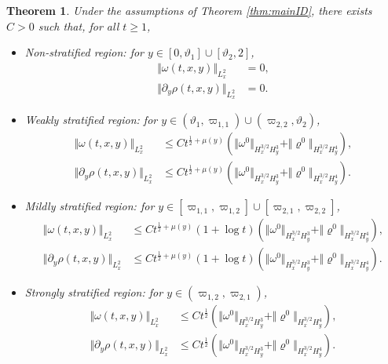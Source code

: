 \documentclass[11pt,reqno]{amsproc}
\newcounter{bigthm}
\newtheorem{bigtheorem}[bigthm]{Theorem}
\theoremstyle{definition}
\numberwithin{equation}{section}
\begin{document}
\begin{bigtheorem}\label{thm:growth}
Under the assumptions of Theorem \ref{thm:mainID}, there exists $C>0$ such that, for all $t\geq 1$, 
\begin{itemize}
\item {\em Non-stratified region:} for $y\in [0,\vartheta_1] \cup [\vartheta_2,2]$,
\begin{align}
\Vert \omega(t,x,y) \Vert_{L^2_x}  &=0, \label{eq:growthomeganonstrat} \\
\Vert \partial_y\rho(t,x,y) \Vert_{L^2_x} &= 0.\label{eq:growthpyrhononstrat} 
\end{align}

\item {\em Weakly stratified region:} for $y\in (\vartheta_1, \varpi_{1,1}) \cup (\varpi_{2,2}, \vartheta_2)$,
\begin{align}
\Vert \omega(t,x,y) \Vert_{L^2_x}  & \leq C t^{\frac12+\mu(y)} \left(  \Vert \omega^0 \Vert_{H^{3/2}_x H^3_y} + \Vert \varrho^0 \Vert_{H^{3/2}_x H^4_y}\right), \label{eq:growthomegaweak} \\
\Vert \partial_y\rho(t,x,y) \Vert_{L^2_x} &\leq C t^{\frac12+\mu(y)} \left(  \Vert \omega^0 \Vert_{H^{3/2}_x H^3_y} + \Vert \varrho^0 \Vert_{H^{3/2}_x H^4_y}\right). \label{eq:growthpyrhoweak} 
\end{align}

\item {\em Mildly stratified region:} for $y\in [\varpi_{1,1}, \varpi_{1,2}] \cup [\varpi_{2,1}, \varpi_{2,2}]$,
\begin{align}
\Vert \omega(t,x,y) \Vert_{L^2_x}  & \leq C t^{\frac12+\mu(y)}( 1 + \log t) \left(  \Vert \omega^0 \Vert_{H^{3/2}_x H^3_y} + \Vert \varrho^0 \Vert_{H^{3/2}_x H^4_y}\right), \label{eq:growthomegamild} \\
\Vert \partial_y\rho(t,x,y) \Vert_{L^2_x} &\leq C t^{\frac12+\mu(y)} ( 1 + \log t) \left(  \Vert \omega^0 \Vert_{H^{3/2}_x H^3_y} + \Vert \varrho^0 \Vert_{H^{3/2}_x H^4_y}\right). \label{eq:growthpyrhomild} 
\end{align}

\item {\em Strongly stratified region:} for $y\in (\varpi_{1,2}, \varpi_{2,1})$,
\begin{align}
\Vert \omega(t,x,y) \Vert_{L^2_x}  & \leq C t^{\frac12}\left(  \Vert \omega^0 \Vert_{H^{3/2}_x H^3_y} + \Vert \varrho^0 \Vert_{H^{3/2}_x H^4_y}\right), \label{eq:growthomegastrong} \\
\Vert \partial_y\rho(t,x,y) \Vert_{L^2_x} &\leq C t^{\frac12} \left(  \Vert \omega^0 \Vert_{H^{3/2}_x H^3_y} + \Vert \varrho^0 \Vert_{H^{3/2}_x H^4_y}\right). \label{eq:growthpyrhostrong} 
\end{align}
\end{itemize}
\end{bigtheorem}
\end{document}
